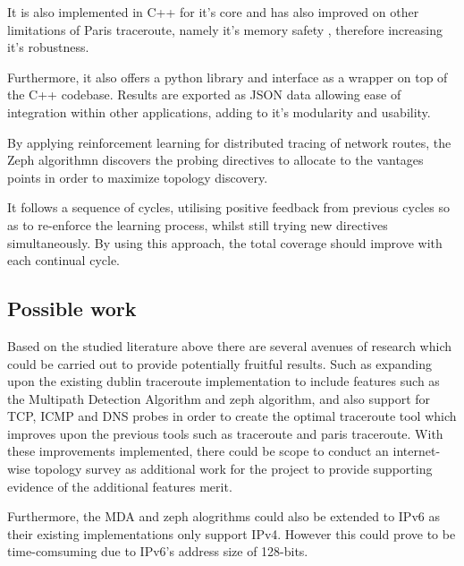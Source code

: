 It is also implemented in C++ for it's core and has also improved on other limitations of Paris traceroute, namely it's memory safety \cite{dublin}, therefore increasing it's robustness. 

Furthermore, it also offers a python library and interface as a wrapper on top of the C++ codebase. Results are exported as JSON data allowing ease of integration within other applications, adding to it's modularity and usability. \cite{dublin_website}


%


By applying reinforcement learning for distributed tracing of network routes, the Zeph algorithmn discovers the probing directives to allocate to the vantages points in order to maximize topology discovery. 

It follows a sequence of cycles, utilising positive feedback from previous cycles so as to re-enforce the learning process, whilst still trying new directives simultaneously. By using this approach, the total coverage should improve with each continual cycle. \cite{zephMap}




\subsection{Possible work}
Based on the studied literature above there are several avenues of research which could be carried out to provide potentially fruitful results. Such as expanding upon the existing dublin traceroute implementation to include features such as the Multipath Detection Algorithm and zeph algorithm, and also support for TCP, ICMP and DNS probes in order to create the optimal traceroute tool which improves upon the previous tools such as traceroute and paris traceroute. With these improvements implemented, there could be scope to conduct an internet-wise topology survey as additional work for the project to provide supporting evidence of the additional features merit. 

Furthermore, the MDA and zeph alogrithms could also be extended to IPv6 as their existing implementations only support IPv4. However this could prove to be time-comsuming due to IPv6's address size of 128-bits. 

\newpage


